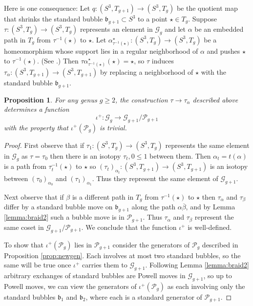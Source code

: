 \documentclass[12pt]{amsart}
\newtheorem{prop}[thm]{Proposition}
\newcommand{\calG}{\mathcal G}
\newcommand{\calP}{\mathcal P}
\newcommand{\bs}{\backslash}
\newcommand{\frb}{\mathfrak{b}}
\begin{document}
    Here is one consequence:  Let $q: (S^3, T_{g+1}) \to (S^3, T_g)$ be the quotient map that shrinks the standard bubble $\frb_{g+1} \subset S^3$ to a point $\star \in T_g$. Suppose $\tau: (S^3, T_g) \to (S^3, T_g)$ represents an element in $\calG_g$ and let $\alpha$ be an embedded path in $T_g$ from $\tau^{-1}(\star)$ to $\star$.  Let $\alpha_{\tau^{-1}(\star)}^{\star}:(S^3, T_g) \to (S^3, T_g)$ be a homeomorphism whose support lies  in a regular neighborhood of $\alpha$ and pushes $\star$ to $\tau^{-1}(\star)$. (See \cite[Homogeneity Lemma]{Mi}.) Then $\tau\alpha_{\tau^{-1}(\star)}^{\star} (\star) = \star$, so $\tau$ induces $\tau_{\alpha}: (S^3, T_{g+1}) \to (S^3, T_{g+1})$ by replacing a neighborhood of $\star$ with the standard bubble $\frb_{g+1}$. %
\begin{prop} \label{prop:Ginclude}  For any genus $g \geq 2$, the construction $\tau \to \tau_{\alpha}$ described above determines a function $$\iota^+: \calG_g \to %
    \calG_{g+1}/\calP_{g+1}$$ with the property that $\iota^+(\calP_g)$ is trivial.
\end{prop}

\begin{proof}   
First observe that if $\tau_1:(S^3, T_g) \to (S^3, T_g)$ represents the same element in $\calG_g$ as $\tau = \tau_0$ then there is an isotopy $\tau_t, 0 \leq 1$ between them.   Then $\alpha_t = t(\alpha)$ is a path from $\tau_t^{-1}(\star)$ to $\star$ so $(\tau_t)_{\alpha_t}: (S^3, T_{g+1}) \to (S^3, T_{g+1})$ is an isotopy between $(\tau_0)_{\alpha_0}$ and $(\tau_1)_{\alpha_1}$.  Thus they represent the same element of $\calG_{g+1}$. 

Next observe that if $\beta$ is a different path in $T_g$ from $\tau^{-1}(\star)$ to $\star$ then $\tau_{\alpha}$ and $\tau_{\beta}$ differ by a standard bubble move on $\frb_{g+1}$ along the path $\alpha \overline{\beta}$, and by Lemma \ref{lemma:braid2} such a bubble move is in $\calP_{g+1}$.  Thus $\tau_{\alpha}$ and $\tau_{\beta}$ represent the same coset in $\calG_{g+1}/\calP_{g+1}$.
We conclude that the function $\iota^+$ is well-defined.  

To show that $\iota^+(\calP_g)$ lies in $\calP_{g+1}$ consider the generators of $\calP_g$ described in Proposition \ref{prop:newgen}.  Each involves at most two standard bubbles, so the same will be true once $\iota^+$ carries them to $\calG_{g+1}$.  Following Lemma \ref{lemma:braid2} arbitrary exchanges of standard bubbles are Powell moves in $\calG_{g+1}$, so up to Powell moves, we can view the generators of $\iota^+(\calP_g)$ as each involving only the standard bubbles $\frb_1$ and $\frb_2$, where each is a standard generator of $\calP_{g+1}$.  
 \end{proof}
\end{document}
